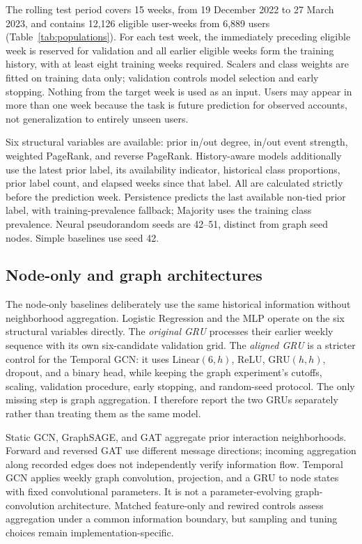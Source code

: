 \documentclass[11pt,a4paper]{article}
\begin{document}
The rolling test period covers 15 weeks, from 19 December 2022 to 27 March 2023, and contains 12,126 eligible user-weeks from 6,889 users (Table~\ref{tab:populations}). For each test week, the immediately preceding eligible week is reserved for validation and all earlier eligible weeks form the training history, with at least eight training weeks required. Scalers and class weights are fitted on training data only; validation controls model selection and early stopping. Nothing from the target week is used as an input. Users may appear in more than one week because the task is future prediction for observed accounts, not generalization to entirely unseen users.

Six structural variables are available: prior in/out degree, in/out event strength, weighted PageRank, and reverse PageRank. History-aware models additionally use the latest prior label, its availability indicator, historical class proportions, prior label count, and elapsed weeks since that label. All are calculated strictly before the prediction week. Persistence predicts the last available non-tied prior label, with training-prevalence fallback; Majority uses the training class prevalence. Neural pseudorandom seeds are 42--51, distinct from graph seed nodes. Simple baselines use seed 42.

\subsection{Node-only and graph architectures}
The node-only baselines deliberately use the same historical information without neighborhood aggregation. Logistic Regression and the MLP operate on the six structural variables directly. The \emph{original GRU} processes their earlier weekly sequence with its own six-candidate validation grid. The \emph{aligned GRU} is a stricter control for the Temporal GCN: it uses Linear$(6,h)$, ReLU, GRU$(h,h)$, dropout, and a binary head, while keeping the graph experiment's cutoffs, scaling, validation procedure, early stopping, and random-seed protocol. The only missing step is graph aggregation. I therefore report the two GRUs separately rather than treating them as the same model.

Static GCN, GraphSAGE, and GAT aggregate prior interaction neighborhoods. Forward and reversed GAT use different message directions; incoming aggregation along recorded edges does not independently verify information flow. Temporal GCN applies weekly graph convolution, projection, and a GRU to node states with fixed convolutional parameters. It is not a parameter-evolving graph-convolution architecture. Matched feature-only and rewired controls assess aggregation under a common information boundary, but sampling and tuning choices remain implementation-specific.
\end{document}
